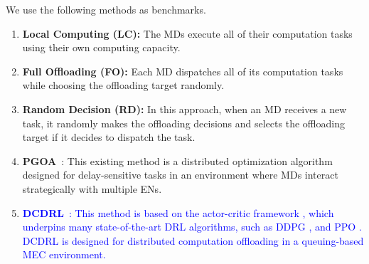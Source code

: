 \documentclass[10pt, journal,letterpaper]{IEEEtran}
\begin{document}
We use the following methods as benchmarks.
\begin{enumerate}

\item \textbf{Local Computing (LC):} The MDs execute all of their computation tasks using their own computing capacity.

\item \textbf{Full Offloading (FO):} Each MD dispatches all of its computation tasks while choosing the offloading target randomly. %

\item \textbf{Random Decision (RD):} In this approach, when an MD receives a new task, it randomly makes the offloading decisions and selects the offloading target if it decides to dispatch the task. %

\item \textbf{PGOA}~\cite{yang2018distributed}: 
This existing method is a distributed optimization algorithm designed for delay-sensitive tasks in an environment where MDs interact strategically with multiple ENs. %


\item \textcolor{blue}{\textbf{DCDRL}~\cite{qiu2020distributed}: This method is based on the actor-critic framework \cite{NIPS1999_6449f44a}, which underpins many state-of-the-art DRL algorithms, such as DDPG \cite{lillicrap2015continuous}, and PPO \cite{schulman2017proximal}. DCDRL is designed for distributed computation offloading in a queuing-based MEC environment.} %



	





\end{enumerate}
\end{document}
